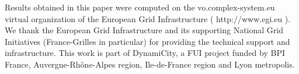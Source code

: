 \documentclass{article}
\begin{document}
 
 Results obtained in this paper were computed on the vo.complex-system.eu virtual organization of the European Grid Infrastructure ( http://www.egi.eu ). We thank the European Grid Infrastructure and its supporting National Grid Initiatives (France-Grilles in particular) for providing the technical support and infrastructure. This work is part of DynamiCity, a FUI project funded by BPI France, Auvergne-Rh{\^o}ne-Alpes region, Ile-de-France region and Lyon metropolis.
  



\end{document}
